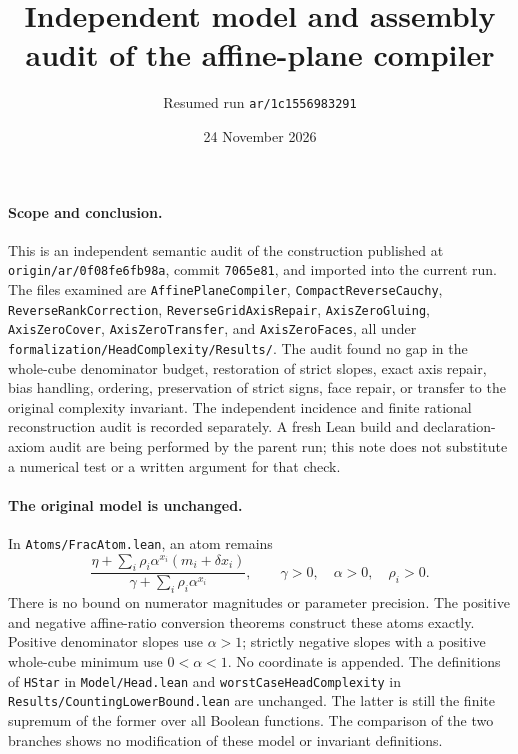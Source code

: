 \documentclass[11pt]{article}
\begin{document}
\title{Independent model and assembly audit of the affine-plane compiler}
\author{Resumed run \texttt{ar/1c1556983291}}
\date{24 November 2026}
\maketitle

\paragraph{Scope and conclusion.}
This is an independent semantic audit of the construction published at
\texttt{origin/ar/0f08fe6fb98a}, commit \texttt{7065e81}, and imported into
the current run.  The files examined are \texttt{AffinePlaneCompiler},
\texttt{CompactReverseCauchy}, \texttt{ReverseRankCorrection},
\texttt{ReverseGridAxisRepair}, \texttt{AxisZeroGluing},
\texttt{AxisZeroCover}, \texttt{AxisZeroTransfer}, and
\texttt{AxisZeroFaces}, all under
\texttt{formalization/HeadComplexity/Results/}.
The audit found no gap in the whole-cube denominator budget, restoration of
strict slopes, exact axis repair, bias handling, ordering, preservation of
strict signs, face repair, or transfer to the original complexity invariant.
The independent incidence and finite rational reconstruction audit is
recorded separately.  A fresh Lean build and declaration-axiom audit are
being performed by the parent run; this note does not substitute a numerical
test or a written argument for that check.

\paragraph{The original model is unchanged.}
In \texttt{Atoms/FracAtom.lean}, an atom remains
\[
 \frac{\eta+\sum_i\rho_i\alpha^{x_i}(m_i+\delta x_i)}
 {\gamma+\sum_i\rho_i\alpha^{x_i}},
 \qquad \gamma>0,\quad\alpha>0,\quad\rho_i>0.
\]
There is no bound on numerator magnitudes or parameter precision.  The
positive and negative affine-ratio conversion theorems construct these
atoms exactly.  Positive denominator slopes use $\alpha>1$; strictly
negative slopes with a positive whole-cube minimum use $0<\alpha<1$.
No coordinate is appended.  The definitions of \texttt{HStar} in
\texttt{Model/Head.lean} and \texttt{worstCaseHeadComplexity} in
\texttt{Results/CountingLowerBound.lean} are unchanged.  The latter is
still the finite supremum of the former over all Boolean functions.
The comparison of the two branches shows no modification of these model
or invariant definitions.
\end{document}
